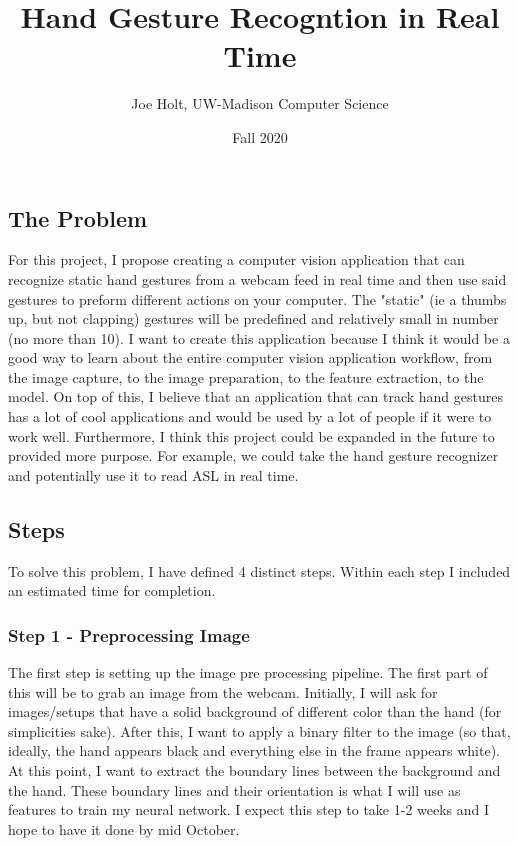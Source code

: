 \documentclass[11pt]{article}
\title{Hand Gesture Recogntion in Real Time}
\date{Fall 2020}
\author{Joe Holt, UW-Madison Computer Science}
\begin{document}
\maketitle

\subsection{The Problem}
For this project, I propose creating a computer vision application that can recognize static hand gestures from a webcam feed in real time and then use said gestures to preform different actions on your computer. The "static" (ie a thumbs up, but not clapping) gestures will be predefined and relatively small in number (no more than 10). I want to create this application because I think it would be a good way to learn about the entire computer vision application workflow, from the image capture, to the image preparation, to the feature extraction, to the model. On top of this, I believe that an application that can track hand gestures has a lot of cool applications and would be used by a lot of people if it were to work well. Furthermore, I think this project could be expanded in the future to provided more purpose. For example, we could take the hand gesture recognizer and potentially use it to read ASL in real time. 

\subsection{Steps}
To solve this problem, I have defined 4 distinct steps. Within each step I included an estimated time for completion.

\subsubsection{Step 1 - Preprocessing Image}
The first step is setting up the image pre processing pipeline. The first part of this will be to grab an image from the webcam. Initially, I will ask for images/setups that have a solid background of different color than the hand (for simplicities sake). After this, I want to apply a binary filter to the image (so that, ideally, the hand appears black and everything else in the frame appears white). At this point, I want to extract the boundary lines between the background and the hand. These boundary lines and their orientation is what I will use as features to train my neural network. I expect this step to take 1-2 weeks and I hope to have it done by mid October. 
\end{document}
